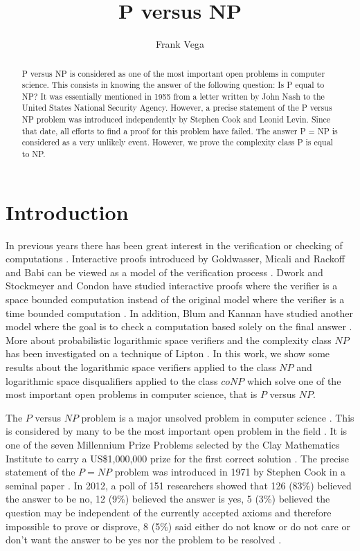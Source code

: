 \documentclass[a4paper,UKenglish,cleveref, autoref]{lipics-v2019}
\title{P versus NP} %
\author{Frank Vega}{Joysonic, Uzun Mirkova 5, Belgrade, 11000, Serbia} {vega.frank@gmail.com}{https://orcid.org/0000-0001-8210-4126}{}
\begin{document}
\maketitle

\begin{abstract}
P versus NP is considered as one of the most important open problems in computer science. This consists in knowing the answer of the following question: Is P equal to NP? It was essentially mentioned in 1955 from a letter written by John Nash to the United States National Security Agency. However, a precise statement of the P versus NP problem was introduced independently by Stephen Cook and Leonid Levin. Since that date, all efforts to find a proof for this problem have failed. The answer P = NP is considered as a very unlikely event. However, we prove the complexity class P is equal to NP.
\end{abstract}


\section{Introduction}

In previous years there has been great interest in the verification or checking of computations \cite{LIP90}. Interactive proofs introduced by Goldwasser, Micali and Rackoff and Babi can be viewed as a model of the verification process \cite{LIP90}. Dwork and Stockmeyer and Condon have studied interactive proofs where the verifier is a space bounded computation instead of the original model where the verifier is a time bounded computation \cite{LIP90}. In addition, Blum and Kannan have studied another model where the goal is to check a computation based solely on the final answer \cite{LIP90}. More about probabilistic logarithmic space verifiers and the complexity class $NP$ has been investigated on a technique of Lipton \cite{LIP90}. In this work, we show some results about the logarithmic space verifiers applied to the class $NP$ and logarithmic space disqualifiers applied to the class $coNP$ which solve one of the most important open problems in computer science, that is $P$ versus $NP$.

The $P$ versus $NP$ problem is a major unsolved problem in computer science \cite{CS00}. This is considered by many to be the most important open problem in the field \cite{CS00}. It is one of the seven Millennium Prize Problems selected by the Clay Mathematics Institute to carry a US\$1,000,000 prize for the first correct solution \cite{CS00}. The precise statement of the $P=NP$ problem was introduced in 1971 by Stephen Cook in a seminal paper \cite{CS00}. In 2012, a poll of 151 researchers showed that 126 (83\%) believed the answer to be no, 12 (9\%) believed the answer is yes, 5 (3\%) believed the question may be independent of the currently accepted axioms and therefore impossible to prove or disprove, 8 (5\%) said either do not know or do not care or don't want the answer to be yes nor the problem to be resolved \cite{GA12}.
\end{document}
